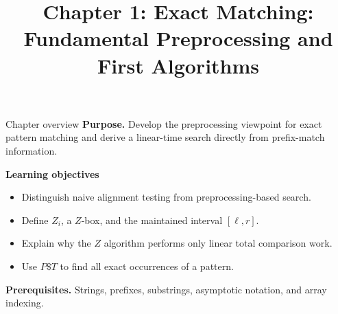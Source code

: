 \documentclass[11pt,letterpaper]{article}
\title{Chapter 1: Exact Matching: Fundamental Preprocessing and First Algorithms}
\author{}
\date{}
\begin{document}
\maketitle

\begin{CornellOverviewBox}{Chapter overview}
\textbf{Purpose.} Develop the preprocessing viewpoint for exact pattern matching and derive a linear-time search directly from prefix-match information.

\textbf{Learning objectives}
\begin{itemize}
  \item Distinguish naive alignment testing from preprocessing-based search.
  \item Define $Z_i$, a $Z$-box, and the maintained interval $[\ell,r]$.
  \item Explain why the $Z$ algorithm performs only linear total comparison work.
  \item Use $P\$T$ to find all exact occurrences of a pattern.
\end{itemize}

\textbf{Prerequisites.} Strings, prefixes, substrings, asymptotic notation, and array indexing.
\end{CornellOverviewBox}
\end{document}
